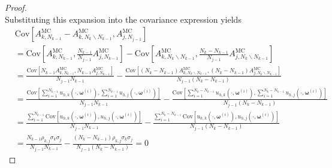 \begin{proof}
\begin{equation*}
\end{equation*}
%
Substituting this expansion into the covariance expression yields
%
\begin{align*}
    &\text{Cov}\left[A_{k,N_{k-1}}^{\text{MC}} - A_{k,N_{k}\backslash N_{k-1}}^{\text{MC}}, A_{j,N_{j-1}}^{\text{MC}}\right]\\
    &=\text{Cov}\left[A_{k,N_{k-1}}^{\text{MC}}, \frac{N_{k-1}}{N_{j-1}}A_{j,N_{k-1}}^{\text{MC}}\right]-\text{Cov}\left[ A_{k,N_{k}\backslash N_{k-1}}^{\text{MC}}, \frac{N_k - N_{k-1}}{N_{j-1}} A_{j,N_{k}\backslash N_{k-1}}^{\text{MC}} \right]\\
    &=\frac{\text{Cov}\left[N_{k-1}A_{k,N_{k-1}}^{\text{MC}}, N_{k-1} A_{j,N_{k-1}}^{\text{MC}}\right]}{N_{j-1}N_{k-1}}-\frac{\text{Cov}\left[(N_k-N_{k-1}) A_{k,N_{k}\backslash N_{k-1}}^{\text{MC}}, (N_k - N_{k-1}) A_{j,N_{k}\backslash N_{k-1}}^{\text{MC}} \right]}{N_{j-1}(N_k-N_{k-1})}\\
    &=\frac{\text{Cov}\left[\sum_{i=1}^{N_{k-1}}u_{h,k}\left(\cdot, \boldsymbol{\omega}^{(i)}\right),\sum_{i=1}^{N_{k-1}}u_{h,j}\left(\cdot, \boldsymbol{\omega}^{(i)}\right)\right]}{N_{j-1}N_{k-1}}
    -\frac{\text{Cov}\left[\sum_{i=1}^{N_k-N_{k-1}}u_{h,k}\left(\cdot, \boldsymbol{\omega}^{(i)}\right), \sum_{i=1}^{N_k-N_{k-1}}u_{h,j}\left(\cdot, \boldsymbol{\omega}^{(i)}\right)\right]}{N_{j-1}(N_k-N_{k-1})}\\
    &=\frac{\sum_{i=1}^{N_{k-1}}\text{Cov}\left[u_{h,k}\left(\cdot, \boldsymbol{\omega}^{(i)}\right),u_{h,j}\left(\cdot, \boldsymbol{\omega}^{(i)}\right)\right]}{N_{j-1}N_{k-1}} -\frac{\sum_{i=1}^{N_k-N_{k-1}}\text{Cov}\left[u_{h,k}\left(\cdot, \boldsymbol{\omega}^{(i)}\right), u_{h,j}\left(\cdot, \boldsymbol{\omega}^{(i)}\right)\right]}{N_{j-1}(N_k-N_{k-1})}\\
    &=\frac{N_{k-1}\rho_{k,j}\sigma_k\sigma_j}{N_{j-1}N_{k-1}}-\frac{(N_k-N_{k-1})\rho_{k,j}\sigma_k\sigma_j}{N_{j-1}(N_k-N_{k-1})}=0
\end{align*}
\end{proof}


